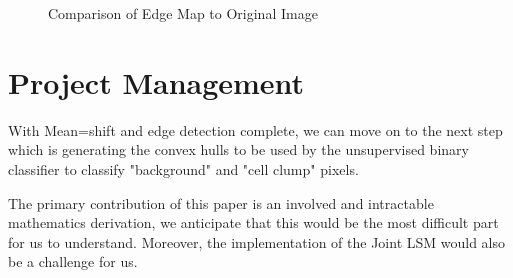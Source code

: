 \documentclass[12pt, letter]{article}
\begin{document}
\begin{figure}%
    \centering
    \qquad
    \caption{Comparison of Edge Map to Original Image}%
    \label{fig:canny}%
\end{figure}


\section{Project Management}

With Mean=shift and edge detection complete, we can move on to the next step which is generating the convex hulls to be used by the unsupervised binary classifier to classify "background" and "cell clump" pixels.

The primary contribution of this paper is an involved and intractable mathematics derivation, we anticipate that this would be the most difficult part for us to understand. Moreover, the implementation of the Joint LSM would also be a challenge for us.
\end{document}
